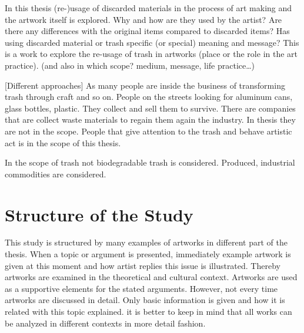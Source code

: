In this thesis (re-)usage of discarded materials in the process of art making and the artwork itself is explored. Why and how are they used by the artist? Are there any differences with the original items compared to discarded items? Has using discarded material or trash specific (or special) meaning and message? This is a work to explore the re-usage of trash in artworks (place or the role in the art practice). (and also in which scope? medium, message, life practice\ldots) 

[Different approaches] As many people are inside the business of transforming trash through craft and so on. People on the streets looking for aluminum cans, glass bottles, plastic. They collect and sell them to survive. There are companies that are collect waste materials to regain them again the industry. In thesis they are not in the scope. People that give attention to the trash and behave artistic act is in the scope of this thesis.

In the scope of trash not biodegradable trash is considered. Produced, industrial commodities are considered.

\section{Structure of the Study}



This study is structured by many examples of artworks in different part of the thesis. When a topic or argument is presented, immediately example artwork is given at this moment and how artist replies this issue is illustrated. Thereby artworks are examined in the theoretical and cultural context. Artworks are used as a supportive elements for the stated arguments.  However, not every time artworks are discussed in detail. Only basic information is given and how it is related with this topic explained.  it is better to keep in mind that all works can be analyzed in different contexts in more detail fashion.

